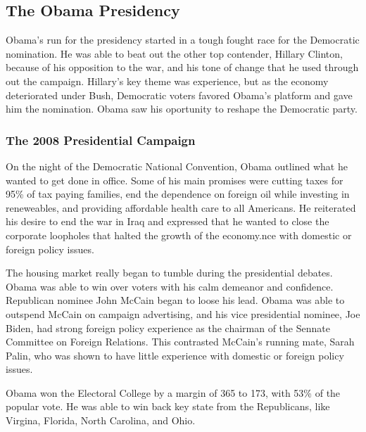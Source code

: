 \documentclass{article}
\begin{document}
    \subsection{The Obama Presidency}
    Obama's run for the presidency started in a tough fought race for the Democratic nomination. He was able to beat out the other top contender, Hillary Clinton, because of his opposition to the war, and his tone of change that he used through out the campaign. Hillary's key theme was experience, but as the economy deteriorated under Bush, Democratic voters favored Obama's platform and gave him the nomination. Obama saw his oportunity to reshape the Democratic party.

        \subsubsection{The 2008 Presidential Campaign}
        On the night of the Democratic National Convention, Obama outlined what he wanted to get done in office. Some of his main promises were cutting taxes for 95\% of tax paying families, end the dependence on foreign oil while investing in reneweables, and providing affordable health care to all Americans. He reiterated his desire to end the war in Iraq and expressed that he wanted to close the corporate loopholes that halted the growth of the economy.nce with domestic or foreign policy issues.\cite{obamacampaign2008}
        \par
        The housing market really began to tumble during the presidential debates. Obama was able to win over voters with his calm demeanor and confidence. Republican nominee John McCain began to loose his lead. Obama was able to outspend McCain on campaign advertising, and his vice presidential nominee, Joe Biden, had strong foreign policy experience as the chairman of the Sennate Committee on Foreign Relations. This contrasted McCain's running mate, Sarah Palin, who was shown to have little experience with domestic or foreign policy issues.\cite{obamacampaign2008}
        \par
        Obama won the Electoral College by a margin of 365 to 173, with 53\% of the popular vote. He was able to win back key state from the Republicans, like Virgina, Florida, North Carolina, and Ohio.
\end{document}

